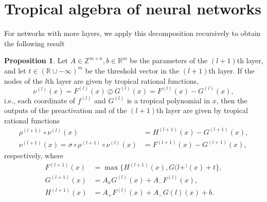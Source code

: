 \documentclass{article}
\theoremstyle{definition}
\newtheorem{proposition}[theorem]{Proposition}
\newtheorem{comment}[theorem]{Comment}
\begin{document}
\newpage

\section{Tropical algebra of neural networks}\label{sec:trop_netw}

For networks with more layers, we apply this decomposition recursively to obtain the following result

\begin{proposition}
Let $A \in \mathbb{Z}^{m \times n}, b \in \mathbb{R}^{m}$ be the parameters of the $(l+1)$th layer, and let $t \in (\mathbb{R} \cup {- \infty})^{m}$ be the threshold vector in the $(l+1)$th layer. If the nodes of the $l$th
layer are given by tropical rational functions,
$$ \nu^{(l)}(x) = F^{(l)}(x) \oslash G^{(l)}(x) = F^{(l)}(x)-G^{(l)}(x),$$
i.e., each coordinate of $f^{(l)}$ and $G^{(l)}$ is a tropical polynomial in $x$, then the outputs of the preactivation and of the $(l+1)$th layer are given by tropical rational functions
\begin{align*}
\rho^{(l+1)} \circ \nu^{(l)}(x) &= H^{(l+1)}(x) - G^{(l+1)}(x), \\
\nu^{(l+1)}(x) = \sigma \circ \rho^{(l+1)} \circ \nu^{(l)}(x) &= F^{(l+1)}(x) - G^{(l+1)}(x),
\end{align*}
respectively, where
\begin{align*}
F^{(l+1)}(x) &= \max \{ H^{(l+1)}(x), G{(l+^)}(x) +t \}, \\
G^{(l+1)}(x) &= A_{x}G^{(l)}(x) + A_{-}F^{(l)}(x), \\
H^{(l+1)}(x) &= A_{+}F^{(l)}(x) + A_{-}G{(l)}(x) +b.
\end{align*}
\end{proposition}
\end{document}
